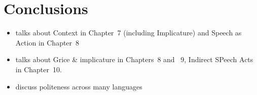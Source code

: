 \documentclass[a4paper,landscape,headrule,footrule,xetex]{foils}
\begin{document}

\section{Conclusions}

\begin{itemize}
\item  \citet{Saeed:2015} talks about Context in Chapter~7 (including Implicature) and  Speech as Action in Chapter~8
\item  \citet{Kroeger:2022} talks about Grice \& implicature in Chapters~8 and ~9, Indirect SPeech Acts in  Chapter~10.
\item \citet{Brown:Levinson:1987} discuss politeness across many languages
\end{itemize}





\small


\end{document}
